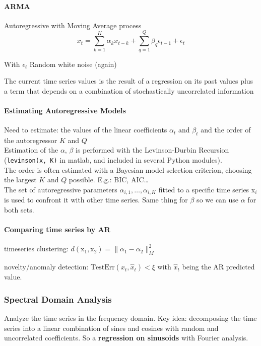 \documentclass[10pt]{report}
\begin{document}
\paragraph{ARMA} Autoregressive with Moving Average process $$x_t = \sum_{k=1}^K \alpha_k x_{t-k} + \sum_{q=1}^Q \beta_q\epsilon_{t-1}+\epsilon_t$$
\begin{list}{}{}
	\item With $\epsilon_t$ Random white noise (again)
	\item The current time series values is the result of a regression on its past values plus a term that depends on a combination of stochastically uncorrelated information
\end{list}
\paragraph{Estimating Autoregressive Models} Need to estimate: the values of the linear coefficients $\alpha_t$ and $\beta_t$ and the order of the autoregressor $K$ and $Q$\\
Estimation of the $\alpha$, $\beta$ is performed with the Levinson-Durbin Recursion (\texttt{levinson(x, K)} in matlab, and included in several Python modules).\\
The order is often estimated with a Bayesian model selection criterion, choosing the largest $K$ and $Q$ possible. E.g.: BIC, AIC\ldots\\
The set of autoregressive parameters $\alpha_{i,1},\ldots,\alpha_{i,K}$ fitted to a specific time series x$_i$ is used to confront it with other time series. Same thing for $\beta$ so we can use $\alpha$ for both sets.
\paragraph{Comparing time series by AR}\begin{list}{}{}
	\item timeseries clustering: $d(\text{x}_1,\text{x}_2)=\|\alpha_1-\alpha_2\|_M^2$
	\item novelty/anomaly detection: $\text{TestErr}(x_t,\hat{x}_t)<\xi$ with $\hat{x}_t$ being the AR predicted value.
\end{list}
\subsubsection{Spectral Domain Analysis}
Analyze the time series in the frequency domain. Key idea: decomposing the time series into a linear combination of sines and cosines with random and uncorrelated coefficients. So a \textbf{regression on sinusoids} with Fourier analysis.
\end{document}
